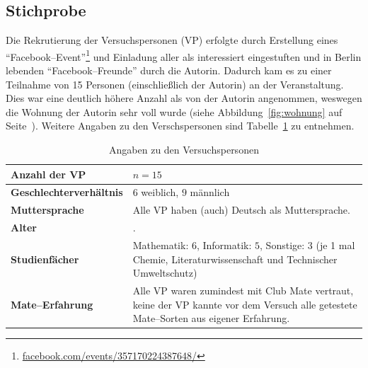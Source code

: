 \documentclass[11pt,a4paper,ngerman]{article}
\begin{document}
\subsection{Stichprobe}\label{sec:stichprobe}
Die Rekrutierung der Versuchspersonen (VP) erfolgte durch Erstellung eines "`Facebook--Event"'\footnote{\href{https://www.facebook.com/events/357170224387648/}{facebook.com/events/357170224387648/}} 
und Einladung aller als interessiert eingestuften und in Berlin lebenden "`Facebook--Freunde"' durch die Autorin. Dadurch kam es zu einer Teilnahme von 15 Personen (einschließlich der Autorin) an der Veranstaltung. Dies war eine deutlich höhere Anzahl als von der Autorin angenommen, weswegen die Wohnung der Autorin sehr voll wurde (siehe Abbildung~\ref{fig:wohnung} auf Seite~\pageref{fig:wohnung}). Weitere Angaben zu den Verschspersonen sind Tabelle~\ref{tab:VP} zu entnehmen.

\begin{table}[h!]
\centering
    \begin{tabular}{|>{\bfseries}l|p{6cm}|}
    \hline
    Anzahl der VP & $n=15$ \\
  \hline
    Geschlechterverhältnis & $6$ weiblich, $9$ männlich \\
  \hline
    Muttersprache & Alle VP haben (auch) Deutsch als Muttersprache. \\
  \hline
    Alter & . \\ %
  \hline
    Studienfächer & 
	Mathematik: $6$,
	Informatik: $5$,
	Sonstige: $3$ (je 1 mal Chemie, Literaturwissenschaft und Technischer Umweltschutz) 
	 \\
  \hline
    Mate--Erfahrung & Alle VP waren zumindest mit Club Mate vertraut, keine der VP kannte vor dem Versuch alle getestete Mate--Sorten aus eigener Erfahrung.\\
  \hline
    \end{tabular}
\caption{Angaben zu den Versuchspersonen}
\label{tab:VP}
\end{table} 
\end{document}
